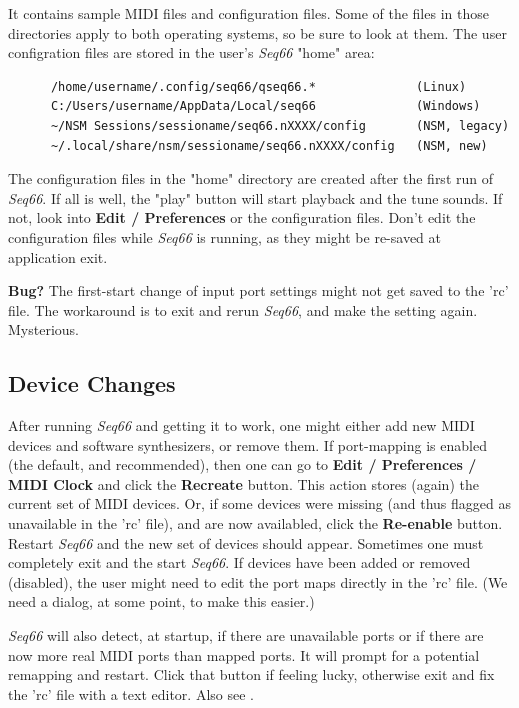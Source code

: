    It contains sample MIDI files and configuration files.
   Some of the files in those directories apply to both operating systems, so
   be sure to look at them.
   The user configration files are stored in the user's
   \textsl{Seq66} "home" area:

   \begin{verbatim}
      /home/username/.config/seq66/qseq66.*              (Linux)
      C:/Users/username/AppData/Local/seq66              (Windows)
      ~/NSM Sessions/sessioname/seq66.nXXXX/config       (NSM, legacy)
      ~/.local/share/nsm/sessioname/seq66.nXXXX/config   (NSM, new)
   \end{verbatim}

   The configuration files in the "home" directory
   are created after the first run of \textsl{Seq66}.
   If all is well, the "play" button will start playback and the tune sounds.
   If not, look into \textbf{Edit / Preferences} or the configuration files.
   Don't edit the configuration files while \textsl{Seq66} is running, as
   they might be re-saved at application exit.

   \textbf{Bug?}
      The first-start change of input port settings might not get saved
      to the 'rc' file. The workaround is to exit and rerun
      \textsl{Seq66}, and make the setting again.
      Mysterious.

\subsection{Device Changes}
\label{subsec:introduction_device_changes}

   After running \textsl{Seq66} and getting it to work, one might
   either add new MIDI devices and software synthesizers, or remove
   them.
   If port-mapping is enabled (the default, and recommended), then
   one can go to
   \textbf{Edit / Preferences / MIDI Clock} and
   click the \textbf{Recreate} button.
   This action stores (again) the current set of MIDI devices.
   Or, if some devices were missing (and thus flagged as unavailable
   in the 'rc' file), and are now availabled, click the
   \textbf{Re-enable} button.
   Restart \textsl{Seq66} and the new set of devices should appear.
   Sometimes one must completely exit and the start \textsl{Seq66}.
   If devices have been added or removed (disabled), the user
   might need to edit the port maps directly in the 'rc' file.
   (We need a dialog, at some point, to make this easier.)

   \textsl{Seq66} will also detect, at startup, if there are unavailable
   ports or if there are now more real MIDI ports than mapped ports.
   It will prompt for a potential remapping and restart.
   Click that button if feeling lucky, otherwise
   exit and fix the 'rc' file with a text editor.
   Also see .

